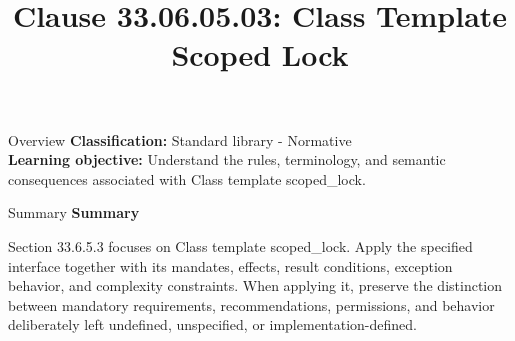 \documentclass[10pt,letterpaper]{article}
\title{Clause 33.06.05.03: Class Template Scoped Lock}
\author{}
\date{}
\begin{document}
\maketitle
\begin{CornellOverviewBox}{Overview}
\textbf{Classification:} Standard library - Normative\\[2pt]
\textbf{Learning objective:} Understand the rules, terminology, and semantic consequences associated with Class template scoped\_lock.
\end{CornellOverviewBox}\begin{CornellSummaryBox}{Summary}
{\sffamily\bfseries\color{Accent} Summary}\par\vspace{3pt}Section 33.6.5.3 focuses on Class template scoped\_lock. Apply the specified interface together with its mandates, effects, result conditions, exception behavior, and complexity constraints. When applying it, preserve the distinction between mandatory requirements, recommendations, permissions, and behavior deliberately left undefined, unspecified, or implementation-defined.
\end{CornellSummaryBox}
\end{document}
